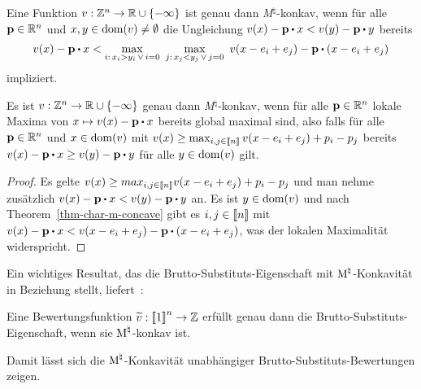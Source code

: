 \begin{theorem}\label{thm-char-m-concave}
	Eine Funktion $v:\mathbb{Z}^n \rightarrow \mathbb{R} \cup \{ -\infty \}$ ist genau dann \emph{M}$^\natural$-konkav, wenn für alle $\mathbf{p}\in\mathbb{R}^n$ und $x,y\in\operatorname{dom}(v)\neq\emptyset$ die Ungleichung $v(x) - \fp\bcdot x < v(y) - \fp \bcdot y$ bereits \[ 
		v(x) - \fp\bcdot x < 
			\max_{i:\, x_i > y_i \,  \vee \, i = 0} \,\,
				\max_{j:\, x_j < y_j \, \vee \, j=0} \,\,
					v(x - e_i + e_j) - \fp \bcdot (x - e_i + e_j)
	\]
	impliziert.
\end{theorem}
\begin{korollar}\label{cor-concave-local-global}
	Es ist $v: \mathbb{Z}^n \rightarrow \mathbb{R} \cup \{ -\infty \}$ genau dann \emph{M}$^\natural$-konkav, wenn für alle $\mathbf{p}\in\mathbb{R}^n$ lokale Maxima von $x \mapsto v(x) - \fp \bcdot x$ bereits global maximal sind, also 
	falls für alle $\mathbf{p}\in\mathbb{R}^n$ und $x\in\operatorname{dom}(v)$ mit $
	v(x)\geq \max_{i,j\in\left\llbracket n \right\rrbracket} v(x - e_i + e_j) + p_i - p_j
	$
	bereits $v(x) - \fp \bcdot x \geq v(y) - \fp \bcdot y$ für alle $y\in\operatorname{dom}(v)$ gilt.
\end{korollar}
\begin{proof}
	Es gelte $v(x) \geq max_{i,j\in\left\llbracket n \right\rrbracket} v(x - e_i + e_j) + p_i - p_j$ und man nehme zusätzlich $v(x) - \fp\bcdot x < v(y) - \fp \bcdot y$ an.
	Es ist $y\in\operatorname{dom}(v)$ und nach Theorem~\ref{thm-char-m-concave} gibt es $i,j\in\left\llbracket n \right\rrbracket$ mit $v(x) - \fp \bcdot x < v(x - e_i + e_j) - \fp\bcdot (x - e_i + e_j)$, was der lokalen Maximalität widerspricht.	
\end{proof}

Ein wichtiges Resultat, das die Brutto-Substituts-Eigenschaft mit $\textrm{\textup{M}}^\natural$-Konkavität in Beziehung stellt, liefert~\cite[Theorem 2.1]{Fujishige2003}:

\begin{theorem}\label{thm-fujishige-gs-iff-concave}
	Eine Bewertungsfunktion $\widetilde{v}:\left\llbracket 1 \right\rrbracket^n\rightarrow \mathbb{Z}$ erfüllt genau dann die Brutto-Substituts-Eigenschaft, wenn sie $\textrm{\textup{M}}^\natural$-konkav ist.
\end{theorem}

Damit lässt sich die $\textrm{\textup{M}}^\natural$-Konkavität unabhängiger Brutto-Substituts-Bewertungen zeigen.

